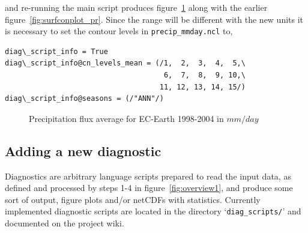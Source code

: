 \documentclass[12pt]{article}
\begin{document}
and re-running the main script produces
figure~\ref{fig:surfconplot_pr_mmday} along with the earlier
figure~\ref{fig:surfconplot_pr}. Since the range will be different
with the new units it is necessary to set the contour levels in
\texttt{precip\_mmday.ncl} to,

\begin{Verbatim}[frame=single, fontsize=\footnotesize]
diag\_script_info = True
diag\_script_info@cn_levels_mean = (/1,  2,  3,  4,  5,\
                                     6,  7,  8,  9, 10,\
                                    11, 12, 13, 14, 15/)
diag\_script_info@seasons = (/"ANN"/)
\end{Verbatim}

%
%
\begin{figure}[ht!]
\begin{center}
\caption{Precipitation flux average for EC-Earth
1998-2004 in $mm/day$}\label{fig:surfconplot_pr_mmday}
\end{center}
\end{figure}


\subsection{Adding a new diagnostic}\label{subsection:addingDiagnostic}
Diagnostics are arbitrary language scripts prepared to read the input
data, as defined and processed by steps 1-4 in
figure~\ref{fig:overview1}, and produce some sort of output, figure
plots and/or netCDFs with statistics. Currently implemented diagnostic
scripts are located in the directory `\texttt{diag\_scripts/}' and
documented on the project wiki\cite{ESMValTool_wiki}.
\end{document}
